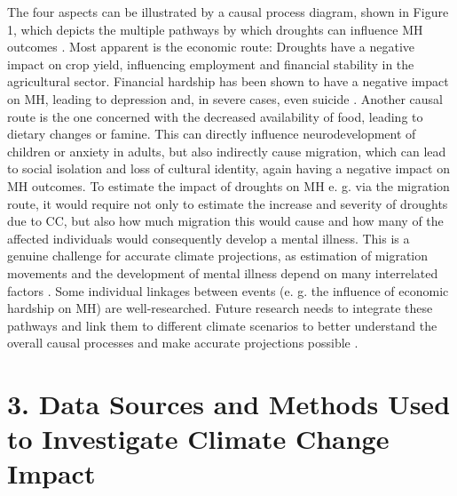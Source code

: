 \documentclass[
]{krantz}
\begin{document}
The four aspects can be illustrated by a causal process diagram, shown in Figure 1, which depicts the multiple pathways by which droughts can influence MH outcomes \citep{vinsMentalHealthOutcomes2015}. Most apparent is the economic route: Droughts have a negative impact on crop yield, influencing employment and financial stability in the agricultural sector. Financial hardship has been shown to have a negative impact on MH, leading to depression and, in severe cases, even suicide \citep[\citet{edwardsImpactDroughtMental2015}]{carletonCropdamagingTemperaturesIncrease2017}. Another causal route is the one concerned with the decreased availability of food, leading to dietary changes or famine. This can directly influence neurodevelopment of children or anxiety in adults, but also indirectly cause migration, which can lead to social isolation and loss of cultural identity, again having a negative impact on MH outcomes. To estimate the impact of droughts on MH e. g. via the migration route, it would require not only to estimate the increase and severity of droughts due to CC, but also how much migration this would cause and how many of the affected individuals would consequently develop a mental illness. This is a genuine challenge for accurate climate projections, as estimation of migration movements and the development of mental illness depend on many interrelated factors \citep{mazhinMigrationHealthCrisis2020}. Some individual linkages between events (e. g. the influence of economic hardship on MH) are well-researched. Future research needs to integrate these pathways and link them to different climate scenarios to better understand the overall causal processes and make accurate projections possible \citep{vinsMentalHealthOutcomes2015}.

\section{3. Data Sources and Methods Used to Investigate Climate Change Impact}\label{data-sources-and-methods-used-to-investigate-climate-change-impact}
\end{document}
